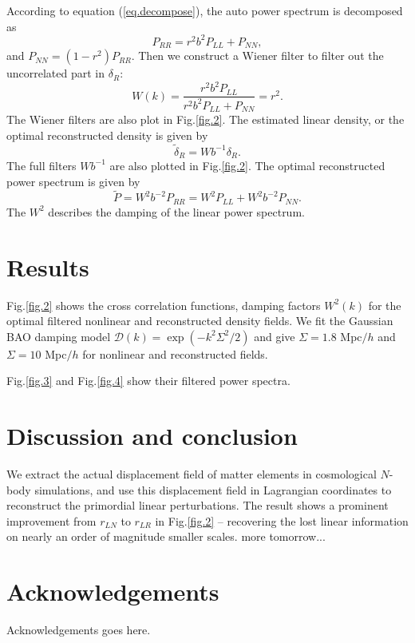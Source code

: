 \documentclass[aps,prd,twocolumn,superscriptaddress,amsfont,amssymb,amsmath,nofootinbib,showpacs,balancelastpage]{revtex4-1}
\begin{document}
According to equation (\ref{eq.decompose}), the auto power spectrum is decomposed as
\begin{equation}
    P_{RR}=r^2b^2P_{LL}+P_{NN},
\end{equation}
and $P_{NN}=(1-r^2)P_{RR}$. Then we construct a Wiener filter to filter out the uncorrelated part in $\delta_R$:
\begin{equation}
    W(k)=\frac{r^2b^2P_{LL}}{r^2b^2P_{LL}+P_{NN}}=r^2.
\end{equation}
The Wiener filters are also plot in Fig.\ref{fig.2}. The estimated linear density, or the optimal reconstructed density is given by
\begin{equation}
    \tilde\delta_R=Wb^{-1}\delta_R.
\end{equation}
The full filters $Wb^{-1}$ are also plotted in Fig.\ref{fig.2}.
The optimal reconstructed power spectrum is given by
\begin{equation}
    \tilde P=W^2b^{-2}P_{RR}=W^2P_{LL}+W^2b^{-2}P_{NN}.
\end{equation}
The $W^2$ describes the damping of the linear power spectrum.









\section{Results}\label{sec.results}
Fig.\ref{fig.2} shows the cross correlation functions,  damping factors $W^2(k)$ for the optimal filtered 
nonlinear and reconstructed density fields. We fit the Gaussian BAO damping model $
{\mathcal D}(k)=\exp(-k^2\Sigma^2/2)$ and give $\Sigma=1.8$ Mpc$/h$ and $\Sigma=10$ 
Mpc$/h$ for nonlinear and reconstructed fields. 

Fig.\ref{fig.3} and Fig.\ref{fig.4} show their filtered power spectra.




\section{Discussion and conclusion}\label{sec.discussion}
We extract the actual displacement field of matter elements in cosmological $N$-body
simulations, and use this displacement field in Lagrangian coordinates to reconstruct
the primordial linear perturbations. The result shows a prominent improvement from
$r_{LN}$ to $r_{LR}$ in Fig.\ref{fig.2} -- recovering the lost linear information on
nearly an order of magnitude smaller scales. more tomorrow...

\section*{Acknowledgements}
Acknowledgements goes here.

%


\end{document}
